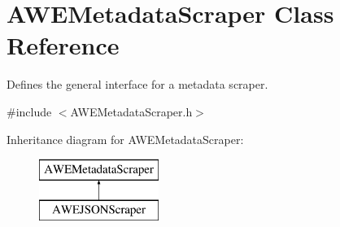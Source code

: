 \hypertarget{class_a_w_e_metadata_scraper}{\section{A\-W\-E\-Metadata\-Scraper Class Reference}
\label{class_a_w_e_metadata_scraper}
}


Defines the general interface for a metadata scraper.  




{\ttfamily \#include $<$A\-W\-E\-Metadata\-Scraper.\-h$>$}

Inheritance diagram for A\-W\-E\-Metadata\-Scraper\-:\begin{figure}[H]
\begin{center}
\leavevmode
\includegraphics[height=2.000000cm]{class_a_w_e_metadata_scraper}
\end{center}
\end{figure}
